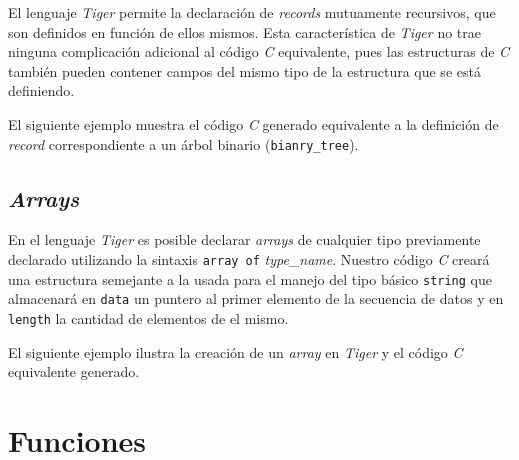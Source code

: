 \documentclass{article}
\begin{document}
\begin{quote}

\end{quote}

\begin{quote}

\end{quote}

El lenguaje \textit{Tiger} permite la declaración de \textit{records}
mutuamente recursivos, que son definidos en función de ellos mismos. Esta
característica de \textit{Tiger} no trae ninguna complicación adicional al
código \textit{C} equivalente, pues las estructuras de \textit{C} también
pueden contener campos del mismo tipo de la estructura que se está definiendo.

El siguiente ejemplo muestra el código \textit{C} generado equivalente a la
definición de \textit{record} correspondiente a un árbol binario
(\texttt{bianry\_tree}).

\begin{quote}

\end{quote}

\begin{quote}

\end{quote}

\subsection{\emph{Arrays}}

En el lenguaje \textit{Tiger} es posible declarar \textit{arrays} de cualquier
tipo previamente declarado utilizando la sintaxis \texttt{array of}
\textit{type\_name}. Nuestro código \textit{C} creará una estructura
semejante a la usada para el manejo del tipo básico \texttt{string} que
almacenará en \texttt{data} un puntero al primer elemento de la secuencia de
datos y en \texttt{length} la cantidad de elementos de el mismo.

El siguiente ejemplo ilustra la creación de un \textit{array} en \textit{Tiger}
y el código \textit{C} equivalente generado.

\begin{quote}

\end{quote}

\begin{quote}

\end{quote}

\section{Funciones}
\end{document}
